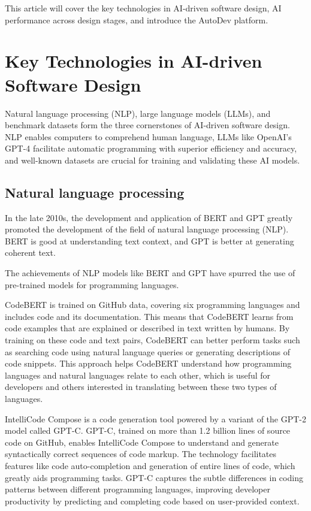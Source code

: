 \documentclass{article}
\begin{document}
This article will cover the key technologies in AI-driven software design, AI performance across design stages, and introduce 
the AutoDev platform.

\section{Key Technologies in AI-driven Software Design}

Natural language processing (NLP), large language models (LLMs), and benchmark datasets form the three cornerstones of 
AI-driven software design. NLP enables computers to comprehend human language, LLMs like OpenAI's GPT-4\cite{qin2023chatgpt}\cite{openai2024gpt4} 
facilitate automatic programming with superior efficiency and accuracy, and well-known datasets\cite{lu2021codexglue} are 
crucial for training and validating these AI models.

\subsection{Natural language processing}
In the late 2010s, the development and application of BERT and GPT greatly promoted the development of the field of natural 
language processing (NLP). BERT is good at understanding text context, and GPT is better at generating coherent text.\cite{devlin2019bert}\cite{solaiman2019release}

The achievements of NLP models like BERT and GPT have spurred the use of pre-trained models for programming languages. 

CodeBERT is trained on GitHub data, covering six programming languages and includes code and its documentation.
 This means that CodeBERT learns from code examples that are explained or described in text written by humans. 
 By training on these code and text pairs, CodeBERT 
can better perform tasks such as searching code using natural language queries or generating descriptions of code snippets. 
This approach helps CodeBERT understand how programming languages and natural languages relate to each other, which is useful 
for developers and others interested in translating between these two types of languages.\cite{feng2020codebert}


IntelliCode Compose is a code generation tool powered by a variant of the GPT-2 model called GPT-C. GPT-C, trained on more 
than 1.2 billion lines of source code on GitHub, enables 
IntelliCode Compose to understand and generate syntactically correct sequences of code markup. The technology facilitates 
features like code auto-completion and generation of entire lines of code, which greatly aids programming tasks. GPT-C captures 
the subtle differences in coding patterns between different programming languages, 
improving developer productivity by predicting and completing code based on user-provided context.\cite{svyatkovskiy2020intellicode}
\end{document}
